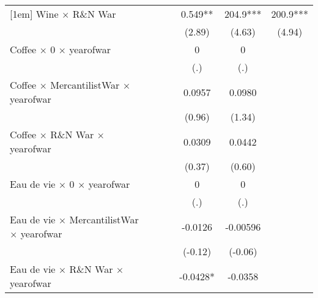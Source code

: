 {\begin{tabular}{l*{6}{c}}
[1em]
Wine $\times$ R\&N War&                     &                     &                     &       0.549** &       204.9***&       200.9***\\
                    &                     &                     &                     &      (2.89)         &      (4.63)         &      (4.94)         \\
[1em]
Coffee $\times$ 0 $\times$ yearofwar&                     &                     &                     &           0         &           0         &                     \\
                    &                     &                     &                     &         (.)         &         (.)         &                     \\
[1em]
Coffee $\times$ MercantilistWar $\times$ yearofwar&                     &                     &                     &      0.0957         &      0.0980         &                     \\
                    &                     &                     &                     &      (0.96)         &      (1.34)         &                     \\
[1em]
Coffee $\times$ R\&N War $\times$ yearofwar&                     &                     &                     &      0.0309         &      0.0442         &                     \\
                    &                     &                     &                     &      (0.37)         &      (0.60)         &                     \\
[1em]
Eau de vie $\times$ 0 $\times$ yearofwar&                     &                     &                     &           0         &           0         &                     \\
                    &                     &                     &                     &         (.)         &         (.)         &                     \\
[1em]
Eau de vie $\times$ MercantilistWar $\times$ yearofwar&                     &                     &                     &     -0.0126         &    -0.00596         &                     \\
                    &                     &                     &                     &     (-0.12)         &     (-0.06)         &                     \\
[1em]
Eau de vie $\times$ R\&N War $\times$ yearofwar&                     &                     &                     &     -0.0428*  &     -0.0358         &                     \\

\end{tabular}}
